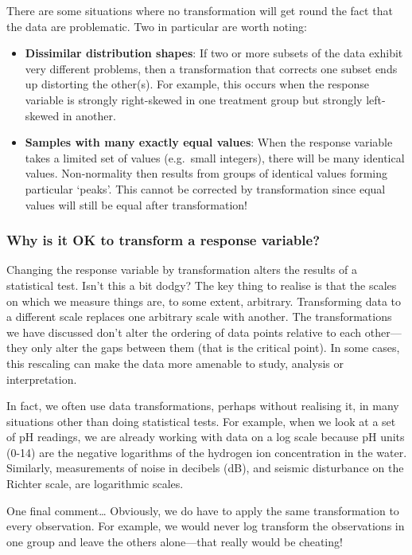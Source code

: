\documentclass[
]{book}
\providecommand{\tightlist}{%
  \setlength{\itemsep}{0pt}\setlength{\parskip}{0pt}}
\newenvironment{greybox}{
  \definecolor{shadecolor}{rgb}{0.95,0.95,0.95}  %
  \color{black}
  \begin{shaded}}
 {\end{shaded}}
\newenvironment{infobox}[1]
  {
  \begin{itemize}
  \renewcommand{\labelitemi}{
    \raisebox{-.7\height}[0pt][0pt]{
      {\setkeys{Gin}{width=3em,keepaspectratio}
        \texttt{[image: images/\#1]}}
    }
  }
  \setlength{\fboxsep}{1em}
  \begin{greybox}
  \item
  }
  {
  \end{greybox}
  \end{itemize}
  }
\begin{document}
There are some situations where no transformation will get round the fact that the data are problematic. Two in particular are worth noting:

\begin{itemize}
\tightlist
\item
  \textbf{Dissimilar distribution shapes}: If two or more subsets of the data exhibit very different problems, then a transformation that corrects one subset ends up distorting the other(s). For example, this occurs when the response variable is strongly right-skewed in one treatment group but strongly left-skewed in another.
\item
  \textbf{Samples with many exactly equal values}: When the response variable takes a limited set of values (e.g.~small integers), there will be many identical values. Non-normality then results from groups of identical values forming particular `peaks'. This cannot be corrected by transformation since equal values will still be equal after transformation!
\end{itemize}

\begin{infobox}{information}

\hypertarget{why-is-it-ok-to-transform-a-response-variable}{%
\subsubsection*{Why is it OK to transform a response variable?}\label{why-is-it-ok-to-transform-a-response-variable}}

Changing the response variable by transformation alters the results of a statistical test. Isn't this a bit dodgy? The key thing to realise is that the scales on which we measure things are, to some extent, arbitrary. Transforming data to a different scale replaces one arbitrary scale with another. The transformations we have discussed don't alter the ordering of data points relative to each other---they only alter the gaps between them (that is the critical point). In some cases, this rescaling can make the data more amenable to study, analysis or interpretation.

In fact, we often use data transformations, perhaps without realising it, in many situations other than doing statistical tests. For example, when we look at a set of pH readings, we are already working with data on a log scale because pH units (0-14) are the negative logarithms of the hydrogen ion concentration in the water. Similarly, measurements of noise in decibels (dB), and seismic disturbance on the Richter scale, are logarithmic scales.

One final comment\ldots{} Obviously, we do have to apply the same transformation to every observation. For example, we would never log transform the observations in one group and leave the others alone---that really would be cheating!

\end{infobox}
\end{document}
